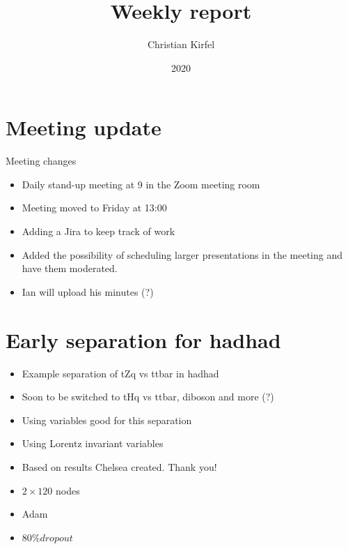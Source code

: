 \documentclass{beamer}
\title{Weekly report}
\author{Christian Kirfel}
\institute{Physikalisches Institut Bonn}
\date{2020}
\begin{document}
\frame{\titlepage}

\section{Meeting update}

\begin{frame}{Meeting changes}
    \begin{itemize}
        \item Daily stand-up meeting at 9 in the Zoom meeting room
        \item Meeting moved to Friday at 13:00
        \item Adding a Jira to keep track of work
        \item Added the possibility of scheduling larger presentations in the meeting and have them moderated.
        \item Ian will upload his minutes (?)
    \end{itemize}
\end{frame}


\section{Early separation for hadhad}
%
\begin{frame}
    \begin{itemize}
        \item Example separation of tZq vs ttbar in hadhad
        \item Soon to be switched to tHq vs ttbar, diboson and more (?)
        \vspace{0.2cm}
        \item Using variables good for this separation
        \item Using Lorentz invariant variables
        \vspace{0.2cm}
        \item Based on results Chelsea created. Thank you!
        \item $2 \times 120$ nodes
        \item Adam
        \item $80\% dropout$
    \end{itemize}
\end{frame}
\end{document}
